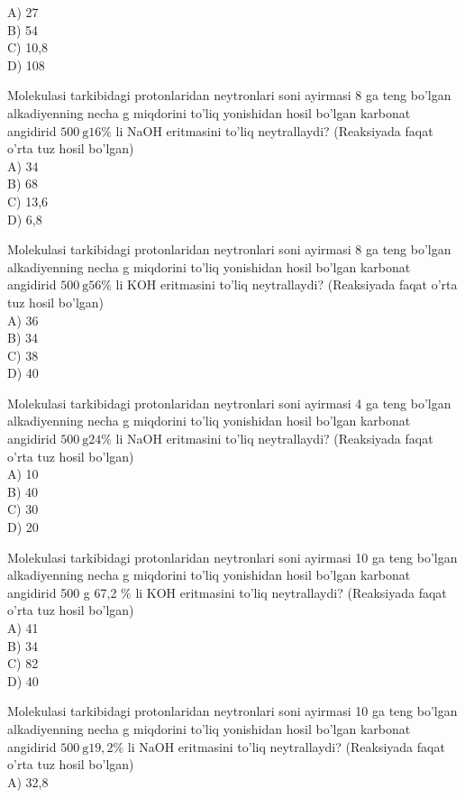 A) 27\\
B) 54\\
C) 10,8\\
D) 108
  \item Molekulasi tarkibidagi protonlaridan neytronlari soni ayirmasi 8 ga teng bo'lgan\\
alkadiyenning necha g miqdorini to'liq yonishidan hosil bo'lgan karbonat angidirid $500 \mathrm{~g} 16 \%$ li NaOH eritmasini to'liq neytrallaydi? (Reaksiyada faqat o'rta tuz hosil bo'lgan)\\
A) 34\\
B) 68\\
C) 13,6\\
D) 6,8
  \item Molekulasi tarkibidagi protonlaridan neytronlari soni ayirmasi 8 ga teng bo'lgan alkadiyenning necha g miqdorini to'liq yonishidan hosil bo'lgan karbonat angidirid $500 \mathrm{~g} 56 \%$ li KOH eritmasini to'liq neytrallaydi? (Reaksiyada faqat o'rta tuz hosil bo'lgan)\\
A) 36\\
B) 34\\
C) 38\\
D) 40
  \item Molekulasi tarkibidagi protonlaridan neytronlari soni ayirmasi 4 ga teng bo'lgan alkadiyenning necha g miqdorini to'liq yonishidan hosil bo'lgan karbonat angidirid $500 \mathrm{~g} 24 \%$ li NaOH eritmasini to'liq neytrallaydi? (Reaksiyada faqat o'rta tuz hosil bo'lgan)\\
A) 10\\
B) 40\\
C) 30\\
D) 20
  \item Molekulasi tarkibidagi protonlaridan neytronlari soni ayirmasi 10 ga teng bo'lgan alkadiyenning necha g miqdorini to'liq yonishidan hosil bo'lgan karbonat angidirid 500 g 67,2 \% li KOH eritmasini to'liq neytrallaydi? (Reaksiyada faqat o'rta tuz hosil bo'lgan)\\
A) 41\\
B) 34\\
C) 82\\
D) 40
  \item Molekulasi tarkibidagi protonlaridan neytronlari soni ayirmasi 10 ga teng bo'lgan alkadiyenning necha g miqdorini to'liq yonishidan hosil bo'lgan karbonat angidirid $500 \mathrm{~g} 19,2 \%$ li NaOH eritmasini to'liq neytrallaydi? (Reaksiyada faqat o'rta tuz hosil bo'lgan)\\
A) 32,8\\
